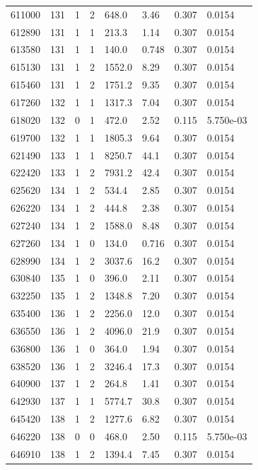 \documentclass[preview]{standalone}
\begin{document}
{{{{{{{{{{{{{{{\begin{tabular}{L{1.2cm}C{1.2cm} C{0.3cm}C{0.5cm} C{1.4cm}C{1.4cm} C{1.4cm}C{1.4cm}}
  611000  &   131  & 1     &  2 &  648.0  & 3.46  & 0.307 &  0.0154   \\ 
  612890  &   131  & 1     &  1 &  213.3  & 1.14  & 0.307 &  0.0154   \\ 
  613580  &   131  & 1     &  1 &  140.0  & 0.748  & 0.307 &  0.0154   \\ 
  615130  &   131  & 1     &  2 &  1552.0  & 8.29  & 0.307 &  0.0154   \\ 
  615460  &   131  & 1     &  2 &  1751.2  & 9.35  & 0.307 &  0.0154   \\ 
  617260  &   132  & 1     &  1 &  1317.3  & 7.04  & 0.307 &  0.0154   \\ 
  618020  &   132  & 0     &  1 &  472.0  & 2.52  & 0.115 &  5.750e-03   \\ 
  619700  &   132  & 1     &  1 &  1805.3  & 9.64  & 0.307 &  0.0154   \\ 
  621490  &   133  & 1     &  1 &  8250.7  & 44.1  & 0.307 &  0.0154   \\ 
  622420  &   133  & 1     &  2 &  7931.2  & 42.4  & 0.307 &  0.0154   \\ 
  625620  &   134  & 1     &  2 &  534.4  & 2.85  & 0.307 &  0.0154   \\ 
  626220  &   134  & 1     &  2 &  444.8  & 2.38  & 0.307 &  0.0154   \\ 
  627240  &   134  & 1     &  2 &  1588.0  & 8.48  & 0.307 &  0.0154   \\ 
  627260  &   134  & 1     &  0 &  134.0  & 0.716  & 0.307 &  0.0154   \\ 
  628990  &   134  & 1     &  2 &  3037.6  & 16.2  & 0.307 &  0.0154   \\ 
  630840  &   135  & 1     &  0 &  396.0  & 2.11  & 0.307 &  0.0154   \\ 
  632250  &   135  & 1     &  2 &  1348.8  & 7.20  & 0.307 &  0.0154   \\ 
  635400  &   136  & 1     &  2 &  2256.0  & 12.0  & 0.307 &  0.0154   \\ 
  636550  &   136  & 1     &  2 &  4096.0  & 21.9  & 0.307 &  0.0154   \\ 
  636800  &   136  & 1     &  0 &  364.0  & 1.94  & 0.307 &  0.0154   \\ 
  638520  &   136  & 1     &  2 &  3246.4  & 17.3  & 0.307 &  0.0154   \\ 
  640900  &   137  & 1     &  2 &  264.8  & 1.41  & 0.307 &  0.0154   \\ 
  642930  &   137  & 1     &  1 &  5774.7  & 30.8  & 0.307 &  0.0154   \\ 
  645420  &   138  & 1     &  2 &  1277.6  & 6.82  & 0.307 &  0.0154   \\ 
  646220  &   138  & 0     &  0 &  468.0  & 2.50  & 0.115 &  5.750e-03   \\ 
  646910  &   138  & 1     &  2 &  1394.4  & 7.45  & 0.307 &  0.0154   \\ 
\hline 
\end{tabular} 

}}}}}}}}}}}}}}}
\end{document}

